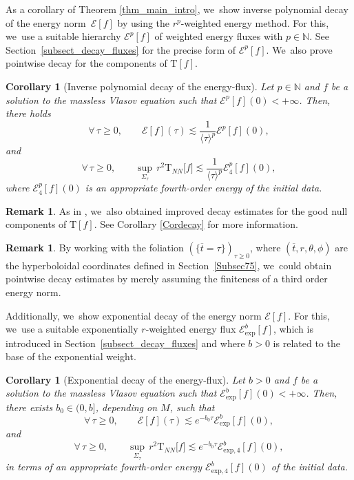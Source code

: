 \documentclass[JEP,XML,SOM,Unicode,published]{cedram}
\theoremstyle{plain}
\newtheorem{corollary}[proposition]{Corollary}
\theoremstyle{definition}
\newtheorem{remark}[proposition]{Remark}
\begin{document}
As a corollary of Theorem \ref{thm_main_intro}, we~show inverse polynomial decay of the energy norm~$\mathcal{E}[f]$ by using the $r^p$-weighted energy method. For this, we~use a suitable hierarchy $\mathcal{E}^p[f]$ of weighted energy fluxes with $p\in \mathbb{N}$. See Section~\ref{subsect_decay_fluxes} for the precise form of $\mathcal{E}^p[f]$. We~also prove pointwise decay for the components of $\mathrm{T}[f]$.

\begin{corollary}[Inverse polynomial decay of the energy-flux]\label{Corintro}
Let $p\in \mathbb{N}$ and $f $ be a solution to the massless Vlasov equation such that $\mathcal{E}^p[f](0) < +\infty$. Then, there holds
\begin{equation}
\forall \, \tau \geq 0, \qquad \mathcal{E}[f](\tau) \lesssim \frac{1}{\langle \tau \rangle^{p}} \mathcal{E}^{p}[f](0),
\end{equation}
and
\begin{equation}
\forall \, \tau \geq 0, \qquad \sup _{\Sigma_\tau} \, r^2 \mathrm{T}_{NN}\bigl[f\bigr] \lesssim \frac{1}{\langle \tau \rangle^{p}} \mathcal{E}^{p}_{4} [f](0),
\end{equation}
where $\mathcal{E}^{p}_{4} [f](0)$ is an appropriate fourth-order energy of the initial data.
\end{corollary}
\begin{remark}
As in \cite{L23,VR23, W23}, we~also obtained improved decay estimates for the good null components of $\mathrm{T}[f]$. See Corollary \ref{Cordecay} for more information.
\end{remark}
\begin{remark}
By working with the foliation $(\{\overline{t}=\tau\})_{\tau \geq 0}$, where $(\overline{t},r,\theta, \phi)$ are the hyperboloidal coordinates defined in Section~\ref{Subsec75}, we~could obtain pointwise decay estimates by merely assuming the finiteness of a third order energy norm.
\end{remark}

Additionally, we~show exponential decay of the energy norm $\mathcal{E}[f]$. For this, we~use a suitable exponentially $r$-weighted energy flux $\mathcal{E}^b_{\mathrm{exp}}[f]$, which is introduced in Section~\ref{subsect_decay_fluxes} and where $b>0$ is related to the base of the exponential weight.

\begin{corollary}[Exponential decay of the energy-flux]\label{Corintro2}
Let $b>0$ and $f $ be a solution to the massless Vlasov equation such that $\mathcal{E}^b_{\mathrm{exp}}[f](0) <+\infty$. Then, there exists $b_0 \in(0,b]$, depending on $M$, such that
\[
\forall \, \tau \geq 0, \qquad \mathcal{E}[f](\tau) \lesssim e^{-b_0 \tau} \mathcal{E}_{\mathrm{exp}}^b[f](0),
\]
and
\begin{equation}
\forall \, \tau \geq 0, \qquad \sup _{\Sigma_\tau} \, r^2 \mathrm{T}_{NN}\bigl[f\bigr] \lesssim e^{-b_0 \tau}\mathcal{E}^{b}_{\mathrm{exp},4} [f](0),
\end{equation}
in terms of an appropriate fourth-order energy $\mathcal{E}^{b}_{\mathrm{exp},4} [f](0)$ of the initial data.
\end{corollary}
\end{document}
